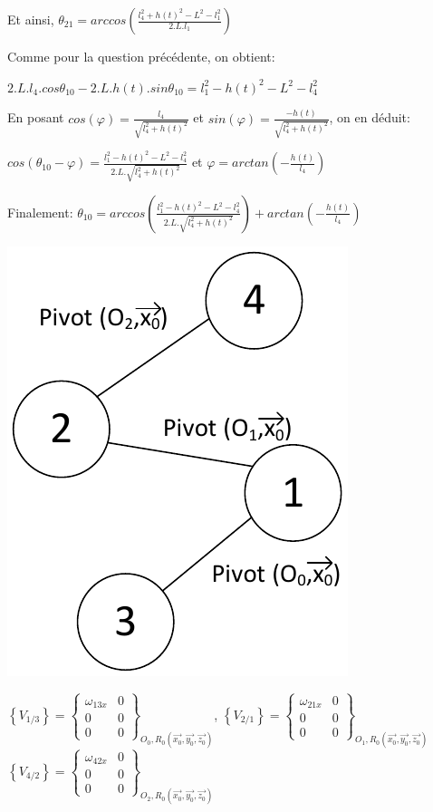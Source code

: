 Et ainsi, $\theta_{21}=arccos\left(\frac{l_4^2+h(t)^2-L^2-l_1^2}{2.L.l_1}\right)$

\cor

Comme pour la question précédente, on obtient:

$2.L.l_4.cos\theta_{10}-2.L.h(t).sin\theta_{10}=l_1^2-h(t)^2-L^2-l_4^2$

En posant $cos(\varphi)=\frac{l_4}{\sqrt{l_4^2+h(t)^2}}$ et $sin(\varphi)=\frac{-h(t)}{\sqrt{l_4^2+h(t)^2}}$, on en déduit:

$cos(\theta_{10}-\varphi)=\frac{l_1^2-h(t)^2-L^2-l_4^2}{2.L.\sqrt{l_4^2+h(t)^2}}$ et $\varphi=arctan\left(-\frac{h(t)}{l_4}\right)$

Finalement: $\theta_{10}=arccos\left(\frac{l_1^2-h(t)^2-L^2-l_4^2}{2.L.\sqrt{l_4^2+h(t)^2}}\right)+arctan\left(-\frac{h(t)}{l_4}\right)$

\cor

\begin{center}
 \includegraphics[width=0.4\linewidth]{img/graphe_liaisons}
\end{center}

\cor

$\left\{V_{1/3}\right\}=\left\{\begin{array}{cc}
\omega_{13x} & 0 \\
0 & 0 \\
0 & 0
\end{array}\right\}_{O_0,R_0(\overrightarrow{x_0},\overrightarrow{y_0},\overrightarrow{z_0})}$,
$\left\{V_{2/1}\right\}=\left\{\begin{array}{cc}
\omega_{21x} & 0 \\
0 & 0 \\
0 & 0
\end{array}\right\}_{O_1,R_0(\overrightarrow{x_0},\overrightarrow{y_0},\overrightarrow{z_0})}$
$\left\{V_{4/2}\right\}=\left\{\begin{array}{cc}
\omega_{42x} & 0 \\
0 & 0 \\
0 & 0
\end{array}\right\}_{O_2,R_0(\overrightarrow{x_0},\overrightarrow{y_0},\overrightarrow{z_0})}$

